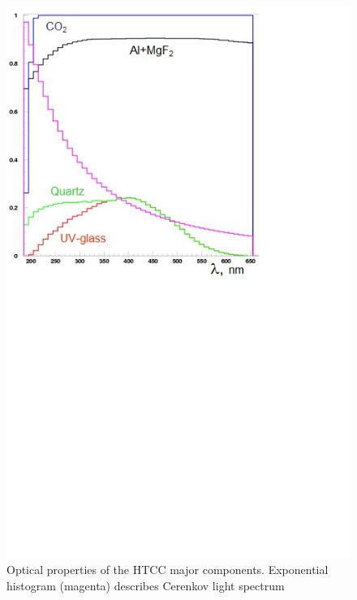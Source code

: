 \begin{figure}[!h]
    \centering
    \includegraphics[width=1.0\linewidth,trim={0.0cm 10.7cm 3.7cm 0.1cm},clip]{images/PROPERTIES.jpg}
    \caption{Optical properties of the HTCC major components. Exponential histogram (magenta) describes Cerenkov light spectrum}
    \label{fig:PROPERTIES}
\end{figure}

